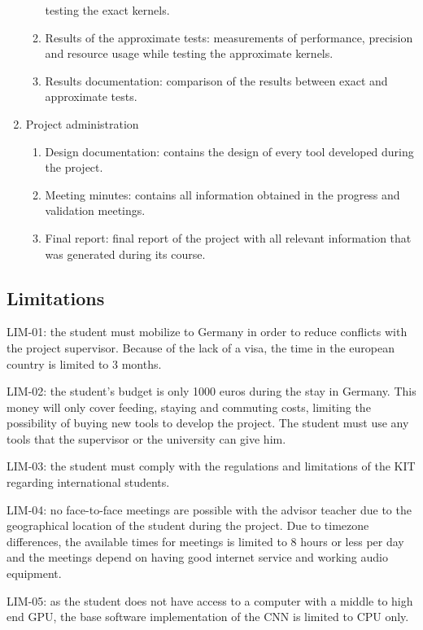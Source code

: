 \begin{enumerate}
\begin{enumerate}
            testing the exact kernels.
            \item Results of the approximate tests: measurements of performance, precision and resource usage while
            testing the approximate kernels.
            \item Results documentation: comparison of the results between exact and approximate tests.
        \end{enumerate}
    \item Project administration
        \begin{enumerate}
            \item Design documentation: contains the design of every tool developed during the project.
            \item Meeting minutes: contains all information obtained in the progress and validation
            meetings.
            \item Final report: final report of the project with all relevant information that was
            generated during its course.
        \end{enumerate}
    
\end{enumerate}

\subsection{Limitations}

LIM-01: the student must mobilize to Germany in order to reduce conflicts with the project supervisor.
Because of the lack of a visa, the time in the european country is limited to 3 months. 
 
LIM-02:​ the student's budget is only 1000 euros during the stay in Germany. This money will only cover feeding, staying and commuting costs,
limiting the possibility of buying new tools to develop the project. The student must use any tools that the supervisor or the university
can give him.

LIM-03: the student must comply with the regulations and limitations of the KIT regarding international
students.

LIM-04: no face-to-face meetings are possible with the advisor teacher due to the geographical location of 
the student during the project. Due to timezone differences, the available times for meetings is limited
to 8 hours or less per day and the meetings depend on having good internet service and working
audio equipment.

LIM-05: as the student does not have access to a computer with a middle to high end GPU, the base software
implementation of the CNN is limited to CPU only.

